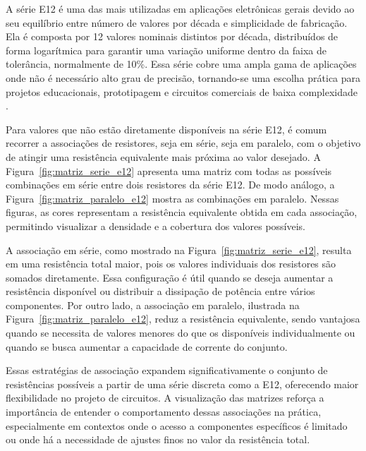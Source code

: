 \documentclass[conference]{IEEEtran}
\begin{document}
A série E12 é uma das mais utilizadas em aplicações eletrônicas gerais devido ao seu equilíbrio entre número de valores por década e simplicidade de fabricação. Ela é composta por 12 valores nominais distintos por década, distribuídos de forma logarítmica para garantir uma variação uniforme dentro da faixa de tolerância, normalmente de 10\%. Essa série cobre uma ampla gama de aplicações onde não é necessário alto grau de precisão, tornando-se uma escolha prática para projetos educacionais, prototipagem e circuitos comerciais de baixa complexidade \cite{iec60063}.

Para valores que não estão diretamente disponíveis na série E12, é comum recorrer a associações de resistores, seja em série, seja em paralelo, com o objetivo de atingir uma resistência equivalente mais próxima ao valor desejado. A Figura~\ref{fig:matriz_serie_e12} apresenta uma matriz com todas as possíveis combinações em série entre dois resistores da série E12. De modo análogo, a Figura~\ref{fig:matriz_paralelo_e12} mostra as combinações em paralelo. Nessas figuras, as cores representam a resistência equivalente obtida em cada associação, permitindo visualizar a densidade e a cobertura dos valores possíveis.

A associação em série, como mostrado na Figura~\ref{fig:matriz_serie_e12}, resulta em uma resistência total maior, pois os valores individuais dos resistores são somados diretamente. Essa configuração é útil quando se deseja aumentar a resistência disponível ou distribuir a dissipação de potência entre vários componentes. Por outro lado, a associação em paralelo, ilustrada na Figura~\ref{fig:matriz_paralelo_e12}, reduz a resistência equivalente, sendo vantajosa quando se necessita de valores menores do que os disponíveis individualmente ou quando se busca aumentar a capacidade de corrente do conjunto.

Essas estratégias de associação expandem significativamente o conjunto de resistências possíveis a partir de uma série discreta como a E12, oferecendo maior flexibilidade no projeto de circuitos. A visualização das matrizes reforça a importância de entender o comportamento dessas associações na prática, especialmente em contextos onde o acesso a componentes específicos é limitado ou onde há a necessidade de ajustes finos no valor da resistência total.
\end{document}
